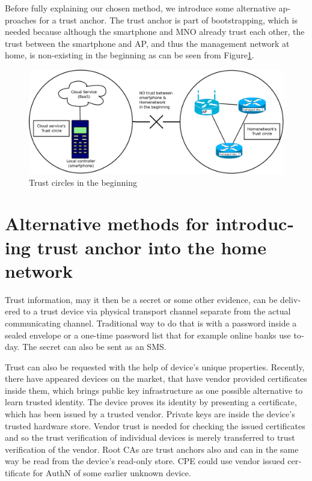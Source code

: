 \documentclass[12pt,a4paper,english]{tutthesis}
\begin{document}
\begin{otherlanguage}{english}
Before fully explaining our chosen method, we introduce some 
alternative
approaches for a trust anchor. The trust anchor is part of bootstrapping,
which is needed because although the smartphone and MNO
already trust each other, the trust between the smartphone and AP, and
thus the management network at home, is non-existing in the
beginning as can be seen from Figure\ref{fig:trustbegin}.

\begin{figure}[htb]
\centering
\includegraphics[width=.9\linewidth]{trustcircles.png}
\caption{\label{fig:trustbegin}Trust circles in the beginning}
\end{figure}

\section{Alternative methods for introducing trust anchor into the home network}
\label{sec-4-1}
\label{sec:altmethods}



 Trust information, may it then be a secret or some
other evidence, can be delivered to a trust device via physical
transport channel separate from the actual communicating channel.
Traditional way to do that is with a password inside a sealed
envelope or a one-time password list that for example online banks 
use today. The secret can also be sent as an SMS.

Trust can also be requested with the help of device's
unique properties. Recently, there have appeared  devices on the market, that
have vendor provided certificates inside them, which brings public key
infrastructure as one possible alternative to learn trusted identity. 
The device proves its identity by presenting a certificate, which has
been issued by a trusted vendor.  Private keys are inside the device's
trusted hardware store. Vendor trust is needed for checking the issued certificates
and so the trust verification of individual devices is merely
transferred to trust verification of the vendor.  Root CAs are trust anchors
also and can in the same way be read from the device's read-only store.
CPE could use vendor issued certificate for AuthN of some earlier
unknown device.  



\end{otherlanguage}
\end{document}
